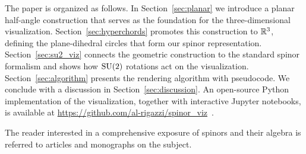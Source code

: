 The paper is organized as follows. In Section~\ref{sec:planar} we introduce a planar half-angle construction that serves as the foundation for the three-dimensional visualization. Section~\ref{sec:hyperchords} promotes this construction to $\mathbb{R}^3$, defining the plane-dihedral circles that form our spinor representation. Section~\ref{sec:su2_viz} connects the geometric construction to the standard spinor formalism and shows how $\mathrm{SU}(2)$ rotations act on the visualization. Section~\ref{sec:algorithm} presents the rendering algorithm with pseudocode. We conclude with a discussion in Section~\ref{sec:discussion}.
An open-source Python implementation of the visualization, together with interactive Jupyter notebooks, is available at \url{https://github.com/al-rigazzi/spinor_viz}~\cite{spinor_viz_github}.

The reader interested in a comprehensive exposure of spinors
and their algebra is referred to articles \cite{steane2013introduction,wheler2000spinor}
and monographs \cite{lounesto2001clifford,penrose1984spinors,hall2015lie} on the subject.

